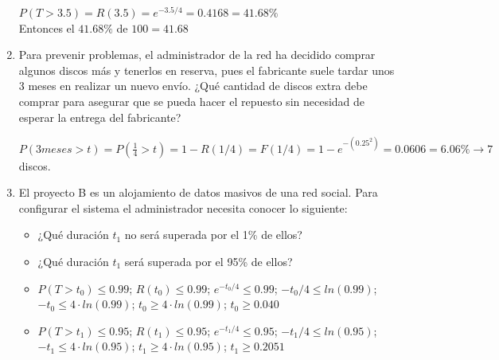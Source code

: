 \begin{enumerate}
\begin{tcolorbox}[colback=white,colframe=cyan!50!black,fonttitle=\bfseries]
    $P(T > 3.5) = R(3.5) = e^{-3.5/4}=0.4168 = 41.68\%$\\
    Entonces el $41.68\%$ de $100 = 41.68$
    \end{tcolorbox}
    \item Para prevenir problemas, el administrador de la red ha decidido comprar algunos discos más y tenerlos en reserva, pues el fabricante suele tardar unos 3 meses en realizar un nuevo envío. ¿Qué cantidad de discos extra debe comprar para asegurar que se pueda hacer el repuesto sin necesidad de esperar la entrega del fabricante?
    \begin{tcolorbox}[colback=white,colframe=cyan!50!black,fonttitle=\bfseries]
    $P(3meses>t)=P(\frac{1}{4}>t)=1-R(1/4)=F(1/4)=1-e^{-(0.25^2)}=0.0606=6.06\% \rightarrow 7$ discos.
    \end{tcolorbox}
    \item El proyecto B es un alojamiento de datos masivos de una red social. Para configurar el sistema el administrador necesita conocer lo siguiente: 
    \begin{itemize}
        \item ¿Qué duración $t_1$ no será superada por el 1\% de ellos?
        \item ¿Qué duración $t_1$ será superada por el 95\% de ellos?
    \end{itemize}
    \begin{tcolorbox}[colback=white,colframe=cyan!50!black,fonttitle=\bfseries]
    \begin{itemize}
        \item $P(T>t_0)\leq 0.99$; $R(t_0)\leq 0.99$; $e^{-t_0/4}\leq 0.99$; $-t_0/4 \leq ln(0.99)$; $-t_0 \leq 4\cdot ln(0.99)$; $t_0 \geq 4\cdot ln(0.99)$; $t_0 \geq 0.040$
        \item $P(T>t_1)\leq 0.95$; $R(t_1)\leq 0.95$; $e^{-t_1/4}\leq 0.95$; $-t_1/4 \leq ln(0.95)$; $-t_1 \leq 4\cdot ln(0.95)$; $t_1 \geq 4\cdot ln(0.95)$; $t_1 \geq 0.2051$
    \end{itemize}
    \end{tcolorbox}
\end{enumerate}

